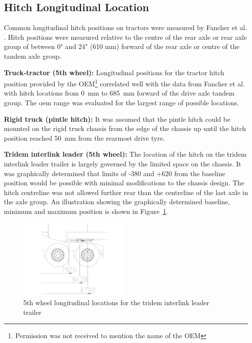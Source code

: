 \subsection{Hitch Longitudinal Location}\label{section:pr-hitch-long-locations}

Common longitudinal hitch positions on tractors were measured by Fancher et al. \cite{Fancher1986}. Hitch positions were measured relative to the centre of the rear axle or rear axle group of between 0" and 24" (610 mm) forward of the rear axle or centre of the tandem axle group.

\textbf{Truck-tractor (5th wheel):}
Longitudinal positions for the tractor hitch position provided by the OEM\footnote{Permission was not received to mention the name of the OEM} correlated well with the data from Fancher et al. with hitch locations from 0~mm to 685~mm forward of the drive axle tandem group. The \gls{oem} range was evaluated for the largest range of possible locations.

\textbf{Rigid truck (pintle hitch):}
It was assumed that the pintle hitch could be mounted on the rigid truck chassis from the edge of the chassis up until the hitch position reached 50~mm from the rearmost drive tyre.

\textbf{Tridem interlink leader (5th wheel):}
The location of the hitch on the tridem interlink leader trailer is largely governed by the limited space on the chassis. It was graphically determined that limits of -380 and +620 from the baseline position would be possible with minimal modifications to the chassis design. The hitch centreline was not allowed further rear than the centreline of the last axle in the axle group. An illustration showing the graphically determined baseline, minimum and maximum position is shown in Figure~\ref{figure:b-double-5th-wheel-hitch-locations}.

\begin{figure}[H]
	\centering
	\includegraphics[width=0.5\textwidth]{fig/baseline_b-double_hitch-locations}
	\caption{5th wheel longitudinal locations for the tridem interlink leader trailer}
	\label{figure:b-double-5th-wheel-hitch-locations}
\end{figure}

